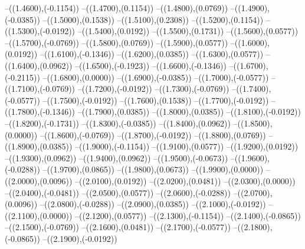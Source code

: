 {	--({\sx*(1.4600)},{\sy*(-0.1154)})
	--({\sx*(1.4700)},{\sy*(0.1154)})
	--({\sx*(1.4800)},{\sy*(0.0769)})
	--({\sx*(1.4900)},{\sy*(-0.0385)})
	--({\sx*(1.5000)},{\sy*(0.1538)})
	--({\sx*(1.5100)},{\sy*(0.2308)})
	--({\sx*(1.5200)},{\sy*(0.1154)})
	--({\sx*(1.5300)},{\sy*(-0.0192)})
	--({\sx*(1.5400)},{\sy*(0.0192)})
	--({\sx*(1.5500)},{\sy*(0.1731)})
	--({\sx*(1.5600)},{\sy*(0.0577)})
	--({\sx*(1.5700)},{\sy*(-0.0769)})
	--({\sx*(1.5800)},{\sy*(0.0769)})
	--({\sx*(1.5900)},{\sy*(0.0577)})
	--({\sx*(1.6000)},{\sy*(0.0192)})
	--({\sx*(1.6100)},{\sy*(-0.1346)})
	--({\sx*(1.6200)},{\sy*(0.0385)})
	--({\sx*(1.6300)},{\sy*(0.0577)})
	--({\sx*(1.6400)},{\sy*(0.0962)})
	--({\sx*(1.6500)},{\sy*(-0.1923)})
	--({\sx*(1.6600)},{\sy*(-0.1346)})
	--({\sx*(1.6700)},{\sy*(-0.2115)})
	--({\sx*(1.6800)},{\sy*(0.0000)})
	--({\sx*(1.6900)},{\sy*(-0.0385)})
	--({\sx*(1.7000)},{\sy*(-0.0577)})
	--({\sx*(1.7100)},{\sy*(-0.0769)})
	--({\sx*(1.7200)},{\sy*(-0.0192)})
	--({\sx*(1.7300)},{\sy*(-0.0769)})
	--({\sx*(1.7400)},{\sy*(-0.0577)})
	--({\sx*(1.7500)},{\sy*(-0.0192)})
	--({\sx*(1.7600)},{\sy*(0.1538)})
	--({\sx*(1.7700)},{\sy*(-0.0192)})
	--({\sx*(1.7800)},{\sy*(-0.1346)})
	--({\sx*(1.7900)},{\sy*(0.0385)})
	--({\sx*(1.8000)},{\sy*(0.0385)})
	--({\sx*(1.8100)},{\sy*(-0.0192)})
	--({\sx*(1.8200)},{\sy*(-0.1731)})
	--({\sx*(1.8300)},{\sy*(-0.0385)})
	--({\sx*(1.8400)},{\sy*(0.0962)})
	--({\sx*(1.8500)},{\sy*(0.0000)})
	--({\sx*(1.8600)},{\sy*(-0.0769)})
	--({\sx*(1.8700)},{\sy*(-0.0192)})
	--({\sx*(1.8800)},{\sy*(0.0769)})
	--({\sx*(1.8900)},{\sy*(0.0385)})
	--({\sx*(1.9000)},{\sy*(-0.1154)})
	--({\sx*(1.9100)},{\sy*(0.0577)})
	--({\sx*(1.9200)},{\sy*(0.0192)})
	--({\sx*(1.9300)},{\sy*(0.0962)})
	--({\sx*(1.9400)},{\sy*(0.0962)})
	--({\sx*(1.9500)},{\sy*(-0.0673)})
	--({\sx*(1.9600)},{\sy*(-0.0288)})
	--({\sx*(1.9700)},{\sy*(0.0865)})
	--({\sx*(1.9800)},{\sy*(0.0673)})
	--({\sx*(1.9900)},{\sy*(0.0000)})
	--({\sx*(2.0000)},{\sy*(0.0096)})
	--({\sx*(2.0100)},{\sy*(0.0192)})
	--({\sx*(2.0200)},{\sy*(0.0481)})
	--({\sx*(2.0300)},{\sy*(0.0000)})
	--({\sx*(2.0400)},{\sy*(-0.0481)})
	--({\sx*(2.0500)},{\sy*(0.0577)})
	--({\sx*(2.0600)},{\sy*(-0.0288)})
	--({\sx*(2.0700)},{\sy*(0.0096)})
	--({\sx*(2.0800)},{\sy*(-0.0288)})
	--({\sx*(2.0900)},{\sy*(0.0385)})
	--({\sx*(2.1000)},{\sy*(-0.0192)})
	--({\sx*(2.1100)},{\sy*(0.0000)})
	--({\sx*(2.1200)},{\sy*(0.0577)})
	--({\sx*(2.1300)},{\sy*(-0.1154)})
	--({\sx*(2.1400)},{\sy*(-0.0865)})
	--({\sx*(2.1500)},{\sy*(-0.0769)})
	--({\sx*(2.1600)},{\sy*(0.0481)})
	--({\sx*(2.1700)},{\sy*(-0.0577)})
	--({\sx*(2.1800)},{\sy*(-0.0865)})
	--({\sx*(2.1900)},{\sy*(-0.0192)})
}
